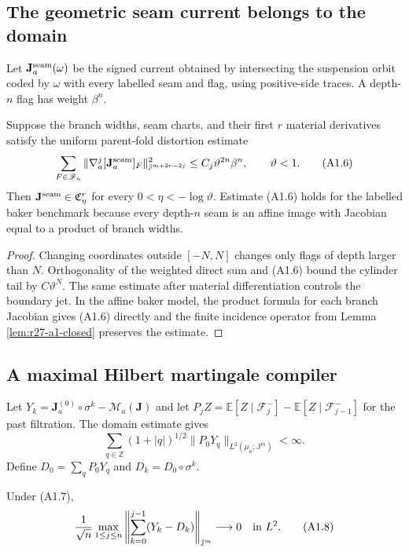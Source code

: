 \subsection{The geometric seam current belongs to the domain}

Let $\mathbf J_a^{\rm seam}(\omega)$ be the signed current obtained by
intersecting the suspension orbit coded by $\omega$ with every labelled seam
and flag, using positive-side traces.  A depth-$n$ flag has weight $\beta^n$.

\begin{proposition}
\label{prop:r27-a1-geometric}
Suppose the branch widths, seam charts, and their first $r$ material
derivatives satisfy the uniform parent-fold distortion estimate
\[
 \sum_{F\in\mathscr F_n}
 \|\nabla_a^j[\mathbf J_a^{\rm seam}]_F\|_{\mathbb J^{m+2r-2j}}^2
 \le C_j\vartheta^{2n}\beta^{n},
 \qquad \vartheta<1.                                    \tag{A1.6}
\]
Then $\mathbf J^{\rm seam}\in\mathfrak C_\eta^r$ for every
$0<\eta<-\log\vartheta$.  Estimate (A1.6) holds for the labelled baker
benchmark because every depth-$n$ seam is an affine image with Jacobian equal
to a product of branch widths.
\end{proposition}

\begin{proof}
Changing coordinates outside $[-N,N]$ changes only flags of depth larger than
$N$.  Orthogonality of the weighted direct sum and (A1.6) bound the cylinder
tail by $C\vartheta^N$.  The same estimate after material differentiation
controls the boundary jet.  In the affine baker model, the product formula
for each branch Jacobian gives (A1.6) directly and the finite incidence
operator from Lemma \ref{lem:r27-a1-closed} preserves the estimate.
\end{proof}

\subsection{A maximal Hilbert martingale compiler}

Let $Y_k=\mathbf J_a^{(0)}\circ\sigma^k-\mathcal M_a(\mathbf J)$ and let
$P_jZ=\mathbb E[Z\mid\mathcal F_j^-]-\mathbb E[Z\mid\mathcal F_{j-1}^-]$ for
the past filtration.  The domain estimate gives
\[
 \sum_{q\in\mathbb Z}(1+|q|)^{1/2}
 \|P_0Y_q\|_{L^2(\mu_a;\mathbb J^m)}<\infty.              \tag{A1.7}
\]
Define $D_0=\sum_qP_0Y_q$ and $D_k=D_0\circ\sigma^k$.

\begin{lemma}
\label{lem:r27-a1-maximal}
Under (A1.7),
\[
 {1\over\sqrt n}
 \max_{1\le j\le n}
 \left\|\sum_{k=0}^{j-1}(Y_k-D_k)\right\|_{\mathbb J^m}
 \longrightarrow0
 \quad\hbox{in }L^2.                                     \tag{A1.8}
\]
\end{lemma}


